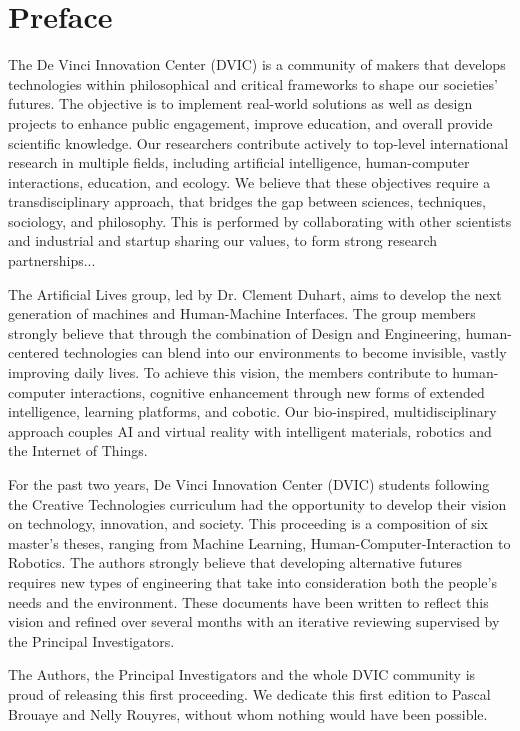 \chapter*{Preface}

The De Vinci Innovation Center (DVIC) is a community of makers that develops
technologies within philosophical and critical frameworks to shape our societies’
futures. The objective is to implement real-world solutions as well as design projects
to enhance public engagement, improve education, and overall provide scientific
knowledge. Our researchers contribute actively to top-level international research
in multiple fields, including artificial intelligence, human-computer interactions,
education, and ecology. We believe that these objectives require a transdisciplinary
approach, that bridges the gap between sciences, techniques, sociology, and philosophy. This is performed by collaborating with other scientists and industrial and
startup sharing our values, to form strong research partnerships...


The Artificial Lives group, led by Dr. Clement Duhart, aims to develop the next generation of machines and Human-Machine Interfaces. The group members strongly
believe that through the combination of Design and Engineering, human-centered
technologies can blend into our environments to become invisible, vastly improving
daily lives. To achieve this vision, the members contribute to human-computer
interactions, cognitive enhancement through new forms of extended intelligence,
learning platforms, and cobotic. Our bio-inspired, multidisciplinary approach couples AI and virtual reality with intelligent materials, robotics and the Internet of
Things.


For the past two years, De Vinci Innovation Center (DVIC) students following
the Creative Technologies curriculum had the opportunity to develop their vision
on technology, innovation, and society. This proceeding is a composition of six
master’s theses, ranging from Machine Learning, Human-Computer-Interaction to
Robotics. The authors strongly believe that developing alternative futures requires
new types of engineering that take into consideration both the people’s needs and
the environment. These documents have been written to reflect this vision and
refined over several months with an iterative reviewing supervised by the Principal
Investigators.


The Authors, the Principal Investigators and the whole DVIC community is proud
of releasing this first proceeding. We dedicate this first edition to Pascal Brouaye
and Nelly Rouyres, without whom nothing would have been possible.

